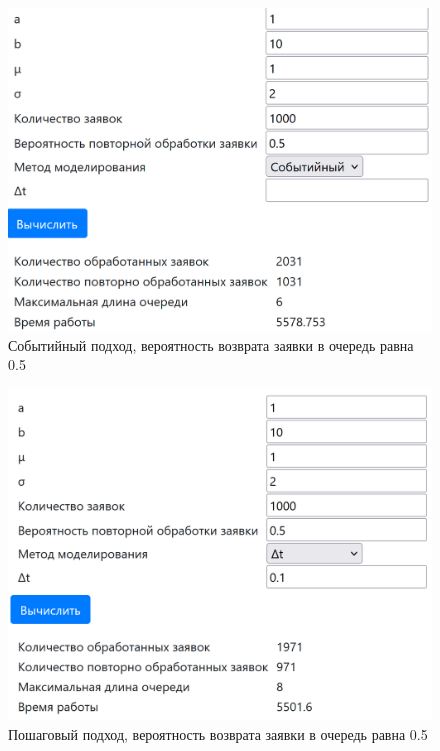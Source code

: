 \documentclass[a4paper, 12pt]{article}
\begin{document}
\begin{figure}[h!]
	\centering \includegraphics[scale=0.7]{3}
	\centering\caption{Событийный подход, вероятность возврата заявки в очередь равна 0.5}
\end{figure}
\begin{figure}[h!]
	\centering \includegraphics[scale=0.7]{4}
	\centering\caption{Пошаговый подход, вероятность возврата заявки в очередь равна 0.5}
\end{figure}
\clearpage
\newpage
\end{document}
